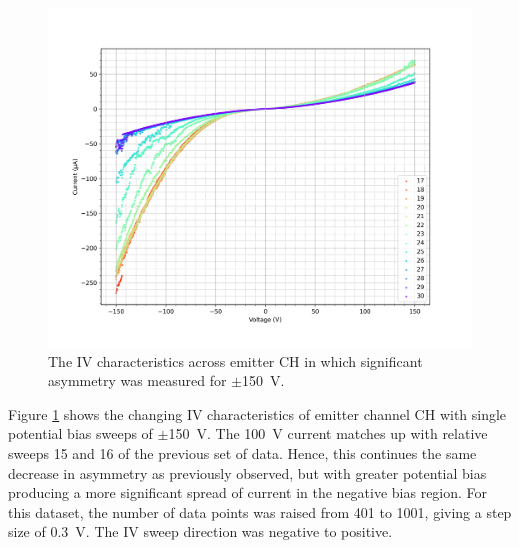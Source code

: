 \begin{refsection}
\begin{figure}[H]
    \centering
    \includegraphics[width=\linewidth]{Chapter7/Figs/Raster/Emitters/146-159_iv.png}
    \caption{The IV characteristics across emitter CH in which significant asymmetry was measured for $\pm$150~\si{\volt}.}
    \label{fig:e_ch_146-159_iv}
\end{figure}

Figure \ref{fig:e_ch_146-159_iv} shows the changing IV characteristics of emitter channel CH with single potential bias sweeps of $\pm$150~\si{\volt}. The 100~\si{\volt} current matches up with relative sweeps 15 and 16 of the previous set of data. Hence, this continues the same decrease in asymmetry as previously observed, but with greater potential bias producing a more significant spread of current in the negative bias region. For this dataset, the number of data points was raised from 401 to 1001, giving a step size of 0.3~\si{\volt}. The IV sweep direction was negative to positive.


\end{refsection}
